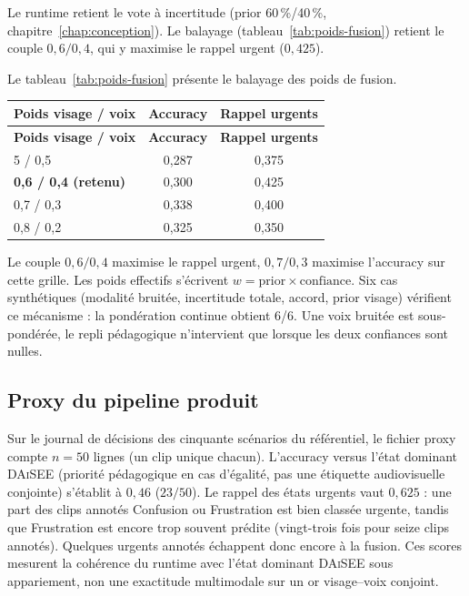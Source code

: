 Le runtime retient le vote à incertitude (prior 60\,\%/40\,\%,
chapitre~\ref{chap:conception}). Le balayage
(tableau~\ref{tab:poids-fusion}) retient le couple $0{,}6/0{,}4$,
qui y maximise le rappel urgent ($0{,}425$).

Le tableau~\ref{tab:poids-fusion} présente le balayage des poids de fusion.

{\small
\renewcommand{\arraystretch}{1.18}
\setlength{\tabcolsep}{4pt}
\begin{xltabular}{\textwidth}{|X|c|c|}
\hline
{}
\textbf{Poids visage / voix} & \textbf{Accuracy} & \textbf{Rappel urgents} \\
\hline
\endfirsthead
\hline
{}
\textbf{Poids visage / voix} & \textbf{Accuracy} & \textbf{Rappel urgents} \\
\hline
\endhead
\endfoot
{}5 / 0{,}5 & 0{,}287 & 0{,}375 \\
\hline
\textbf{0{,}6 / 0{,}4 (retenu)} & 0{,}300 & 0{,}425 \\
7 / 0{,}3 & 0{,}338 & 0{,}400 \\
8 / 0{,}2 & 0{,}325 & 0{,}350 \\
\hline
\end{xltabular}
\label{tab:poids-fusion}
}

Le couple $0{,}6/0{,}4$ maximise le rappel urgent, $0{,}7/0{,}3$
maximise l'accuracy sur cette grille. Les poids effectifs s'écrivent
$w = \mathrm{prior} \times \mathrm{confiance}$. Six cas synthétiques
(modalité bruitée, incertitude totale, accord, prior visage) vérifient
ce mécanisme : la pondération continue obtient 6/6. Une voix bruitée
est sous-pondérée, le repli pédagogique n'intervient que lorsque les
deux confiances sont nulles.

\subsection{Proxy du pipeline produit}
\label{subsec:val-proxy}

Sur le journal de décisions des cinquante scénarios du référentiel,
le fichier proxy compte $n=50$ lignes (un clip unique chacun).
L'accuracy versus l'état dominant \textsc{DAiSEE} (priorité
pédagogique en cas d'égalité, pas une étiquette audiovisuelle
conjointe) s'établit à $0{,}46$ ($23/50$).
Le rappel des états urgents vaut $0{,}625$ : une part des clips
annotés Confusion ou Frustration est bien classée urgente, tandis que
Frustration est encore trop souvent prédite (vingt-trois fois pour
seize clips annotés). Quelques urgents annotés échappent donc encore
à la fusion. Ces scores mesurent la cohérence du runtime avec l'état
dominant \textsc{DAiSEE} sous appariement, non une exactitude
multimodale sur un or visage--voix conjoint.

